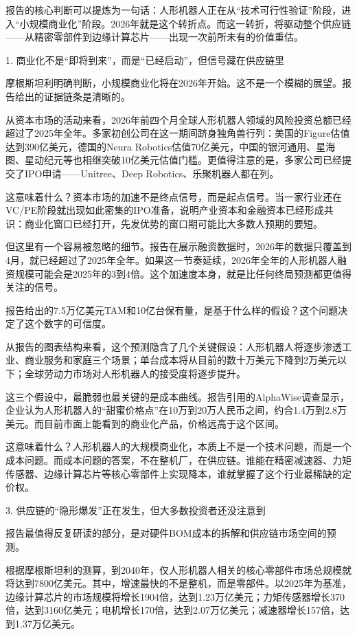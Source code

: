 \documentclass[11pt]{ctexart}
\begin{document}
报告的核心判断可以提炼为一句话：人形机器人正在从“技术可行性验证”阶段，进入“小规模商业化”阶段。2026年就是这个转折点。而这一转折，将驱动整个供应链——从精密零部件到边缘计算芯片——出现一次前所未有的价值重估。

1. 商业化不是“即将到来”，而是“已经启动”，但信号藏在供应链里

摩根斯坦利明确判断，小规模商业化将在2026年开始。这不是一个模糊的展望。报告给出的证据链条是清晰的。

从资本市场的活动来看，2026年前四个月全球人形机器人领域的风险投资总额已经超过了2025年全年。多家初创公司在这一期间跻身独角兽行列：美国的Figure估值达到390亿美元，德国的Neura Robotics估值70亿美元，中国的银河通用、星海图、星动纪元等也相继突破10亿美元估值门槛。更值得注意的是，多家公司已经提交了IPO申请——Unitree、Deep Robotics、乐聚机器人都在列。

这意味着什么？资本市场的加速不是终点信号，而是起点信号。当一家行业还在VC/PE阶段就出现如此密集的IPO准备，说明产业资本和金融资本已经形成共识：商业化窗口已经打开，先发优势的窗口期可能比大多数人预期的要短。

但这里有一个容易被忽略的细节。报告在展示融资数据时，2026年的数据只覆盖到4月，就已经超过了2025年全年。如果这一节奏延续，2026年全年的人形机器人融资规模可能会是2025年的3到4倍。这个加速度本身，就是比任何终局预测都更值得关注的信号。

报告给出的7.5万亿美元TAM和10亿台保有量，是基于什么样的假设？这个问题决定了这个数字的可信度。

从报告的图表结构来看，这个预测隐含了几个关键假设：人形机器人将逐步渗透工业、商业服务和家庭三个场景；单台成本将从目前的数十万美元下降到2万美元以下；全球劳动力市场对人形机器人的接受度将逐步提升。

这三个假设中，最脆弱也最关键的是成本曲线。报告引用的AlphaWise调查显示，企业认为人形机器人的“甜蜜价格点”在10万到20万人民币之间，约合1.4万到2.8万美元。而目前市面上能看到的商业化产品，价格远高于这个区间。

这意味着什么？人形机器人的大规模商业化，本质上不是一个技术问题，而是一个成本问题。而成本问题的答案，不在整机厂，在供应链。谁能在精密减速器、力矩传感器、边缘计算芯片等核心零部件上实现降本，谁就掌握了这个行业最稀缺的定价权。

3. 供应链的“隐形爆发”正在发生，但大多数投资者还没注意到

报告最值得反复研读的部分，是对硬件BOM成本的拆解和供应链市场空间的预测。

根据摩根斯坦利的测算，到2040年，仅人形机器人相关的核心零部件市场总规模就将达到7800亿美元。其中，增速最快的不是整机，而是零部件。以2025年为基准，边缘计算芯片的市场规模将增长1904倍，达到1.23万亿美元；力矩传感器增长370倍，达到3160亿美元；电机增长170倍，达到2.07万亿美元；减速器增长157倍，达到1.37万亿美元。
\end{document}
